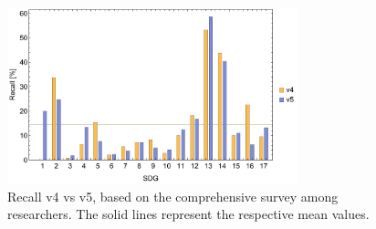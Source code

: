 \documentclass{article}
\begin{document}
\begin{figure}[H]
	\centering
  \includegraphics[width=0.75\textwidth]{figures/recallbarchart.pdf}
	\caption{Recall v4 vs v5, based on the comprehensive survey among researchers. The solid lines represent the respective mean values.}
	\label{recallbarchart}
\end{figure}
\end{document}
